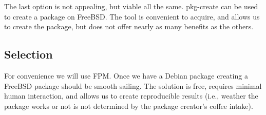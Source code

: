 The last option is not appealing, but viable all the same.
pkg-create can be used to create a package on FreeBSD.
The tool is convenient to acquire, and allows us to create the package, but does not offer nearly as many benefits as the others.

\subsection{Selection}

For convenience we will use FPM.
Once we have a Debian package creating a FreeBSD package should be smooth sailing.
The solution is free, requires minimal human interaction, and allows us to create reproducible results (i.e., weather the package works or not is not determined by the package creator's coffee intake).
